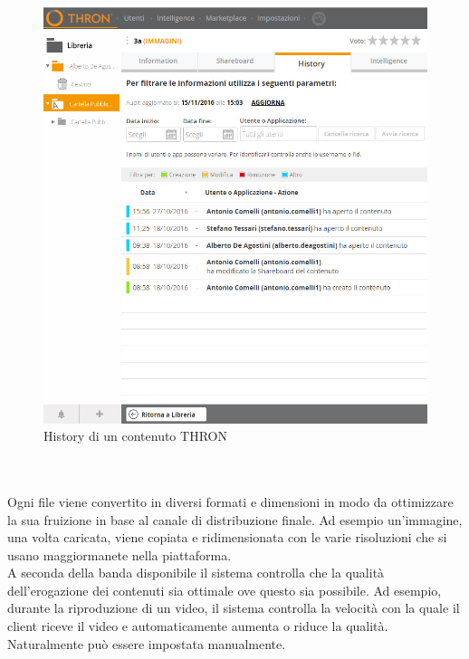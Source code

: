 \documentclass[a4paper, 12pt, twoside, openright]{book}
\begin{document}
\begin{figure}[h] %
	\centering
	\label{content-history}
	\includegraphics[width=1.0\textwidth]{images/content-history.jpg}
	\caption{History di un contenuto THRON}
\end{figure}
\\ \\Ogni file viene convertito in diversi formati e dimensioni in modo da ottimizzare la sua fruizione in base al canale di distribuzione finale. Ad esempio un'immagine, una volta caricata, viene copiata e ridimensionata con le varie risoluzioni che si usano maggiormanete nella piattaforma.\\

A seconda della banda disponibile il sistema controlla che la qualità dell'erogazione dei contenuti sia ottimale ove questo sia possibile. Ad esempio, durante la riproduzione di un video, il sistema controlla la velocità con la quale il client riceve il video e automaticamente aumenta o riduce la qualità. Naturalmente può essere impostata manualmente.\\ \\
\end{document}
